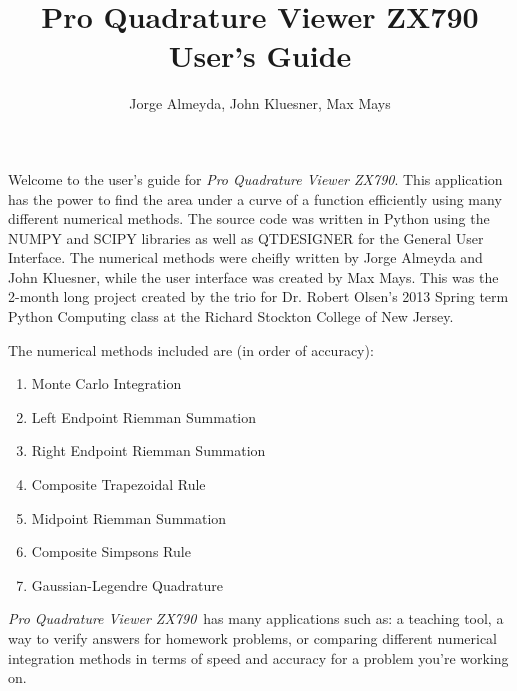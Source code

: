 \documentclass[12pt]{article}
\title{Pro Quadrature Viewer ZX790 \\ \Large User's Guide}
\author{ Jorge Almeyda, John Kluesner, Max Mays}
\newcommand{\newLine}{\vspace{5mm}}
\newcommand{\appname}{\textit{Pro Quadrature Viewer ZX790}}
\begin{document}
\maketitle

\newLine
Welcome to the user's guide for \appname. This application has the power to find the area under a curve of a function efficiently using many different numerical methods. The source code was written in Python using the NUMPY and SCIPY libraries as well as QTDESIGNER for the General User Interface. The numerical methods were cheifly written by Jorge Almeyda and John Kluesner, while the user interface was created by Max Mays. This was the 2-month long project created by the trio for Dr. Robert Olsen's 2013 Spring term Python Computing class at the Richard Stockton College of New Jersey.

\newLine\noindent 
The numerical methods included are (in order of accuracy):
\begin{enumerate}[\indent 1.]
\item Monte Carlo Integration
\item Left Endpoint Riemman Summation
\item Right Endpoint Riemman Summation
\item Composite Trapezoidal Rule
\item Midpoint Riemman Summation
\item Composite Simpsons Rule
\item Gaussian-Legendre Quadrature
\end{enumerate} 
\appname \, has many applications such as: a teaching tool, a way to verify answers for homework problems, or comparing different numerical integration methods in terms of speed and accuracy for a problem you're working on. 
\end{document}
